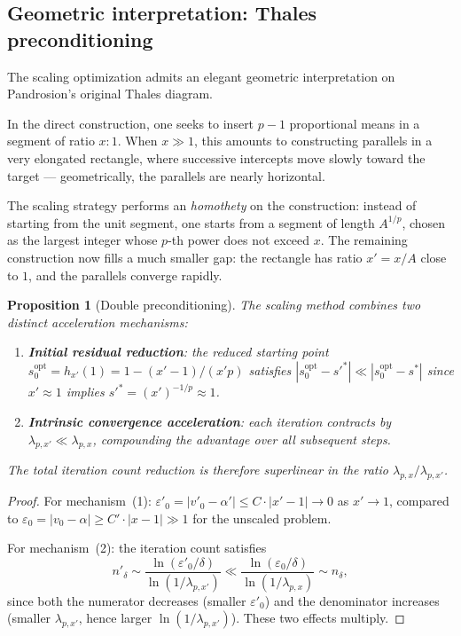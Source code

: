\documentclass[10pt,a4paper,oneside]{book}
\newtheorem{proposition}[theorem]{Proposition}
\theoremstyle{definition}
\theoremstyle{remark}
\newcommand{\eps}{\varepsilon}
\begin{document}
\subsection{Geometric interpretation: Thales preconditioning}
\label{subsec:thales_preconditioning}

The scaling optimization admits an elegant geometric interpretation on Pandrosion's original Thales diagram.

\medskip

In the direct construction, one seeks to insert $p-1$ proportional means in a segment of ratio $x : 1$. When $x \gg 1$, this amounts to constructing parallels in a very elongated rectangle, where successive intercepts move slowly toward the target --- geometrically, the parallels are nearly horizontal.

\smallskip

The scaling strategy performs an \emph{homothety} on the construction: instead of starting from the unit segment, one starts from a segment of length $A^{1/p}$, chosen as the largest integer whose $p$-th power does not exceed $x$. The remaining construction now fills a much smaller gap: the rectangle has ratio $x' = x/A$ close to $1$, and the parallels converge rapidly.

\begin{proposition}[Double preconditioning]
\label{prop:preconditioning}
The scaling method combines two distinct acceleration mechanisms:
\begin{enumerate}
  \item \textbf{Initial residual reduction}: the reduced starting point $s_0^{\mathrm{opt}} = h_{x'}(1) = 1 - (x'-1)/(x'p)$ satisfies $|s_0^{\mathrm{opt}} - s'^*| \ll |s_0^{\mathrm{opt}} - s^*|$ since $x' \approx 1$ implies $s'^* = (x')^{-1/p} \approx 1$.
  \item \textbf{Intrinsic convergence acceleration}: each iteration contracts by $\lambda_{p,x'} \ll \lambda_{p,x}$, compounding the advantage over all subsequent steps.
\end{enumerate}
The total iteration count reduction is therefore superlinear in the ratio $\lambda_{p,x}/\lambda_{p,x'}$.
\end{proposition}

\begin{proof}
For mechanism~(1): $\eps'_0 = |v'_0 - \alpha'| \leq C \cdot |x' - 1| \to 0$ as $x' \to 1$, compared to $\eps_0 = |v_0 - \alpha| \geq C' \cdot |x - 1| \gg 1$ for the unscaled problem.

For mechanism~(2): the iteration count satisfies
\[
  n'_\delta \sim \frac{\ln(\eps'_0/\delta)}{\ln(1/\lambda_{p,x'})} \ll \frac{\ln(\eps_0/\delta)}{\ln(1/\lambda_{p,x})} \sim n_\delta,
\]
since both the numerator decreases (smaller $\eps'_0$) and the denominator increases (smaller $\lambda_{p,x'}$, hence larger $\ln(1/\lambda_{p,x'})$). These two effects multiply.
\end{proof}
\end{document}
